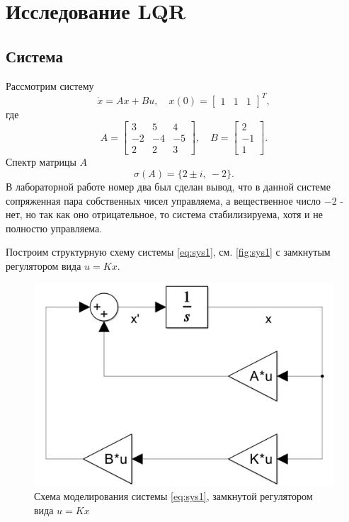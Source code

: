 \section{Исследование LQR}
\subsection{Система}
Рассмотрим систему
\begin{equation}
    \label{eq:sys1}
    \dot x=Ax+Bu,\quad x(0)=\begin{bmatrix}
        1&1&1
    \end{bmatrix}^T,
\end{equation}
где
\begin{equation*}
    A=\begin{bmatrix}
        3 & 5 & 4 \\
        -2 & -4 & -5 \\
        2 & 2 & 3
    \end{bmatrix},\quad
    B=\begin{bmatrix}
        2 \\ -1 \\ 1
    \end{bmatrix}.
\end{equation*}
Спектр матрицы $A$
\begin{equation*}
    \sigma(A)=\{2\pm i,\ -2\}.
\end{equation*}
В лабораторной работе номер два был сделан вывод, что в данной системе сопряженная пара
собственных чисел управляема, а вещественное число $-2$ - нет,
но так как оно отрицательное, то система стабилизируема, хотя и
не полностю управляема. 

Построим структурную схему системы \eqref{eq:sys1}, см. \autoref{fig:sys1} 
с замкнутым регулятором вида $u=Kx$.
\begin{figure}[H]
    \centering
    \includegraphics[width=0.7\linewidth]{figs/1_slx.png}
    \caption{Схема моделирования системы \ref{eq:sys1}, замкнутой
    регулятором вида $u=Kx$}
    \label{fig:sys1}
\end{figure}

